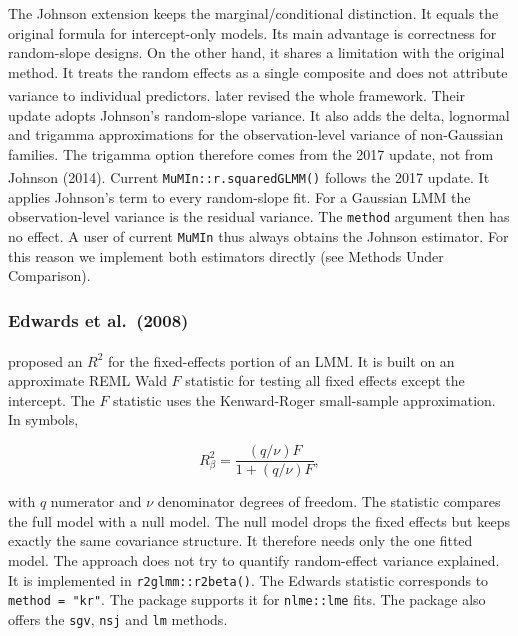 \documentclass[
  11pt,
]{article}
\begin{document}
The Johnson extension keeps the marginal/conditional distinction.
It equals the original formula for intercept-only models. Its main
advantage is correctness for random-slope designs. On the other
hand, it shares a limitation with the original method. It treats
the random effects as a single composite and does not attribute
variance to individual predictors.\textsuperscript{} later revised the whole
framework. Their update adopts Johnson's random-slope variance. It
also adds the delta, lognormal and trigamma approximations for the
observation-level variance of non-Gaussian families. The trigamma
option therefore comes from the 2017 update, not from Johnson
(2014). Current \texttt{MuMIn::r.squaredGLMM()}\textsuperscript{} follows
the 2017 update. It applies Johnson's term to every random-slope
fit. For a Gaussian LMM the observation-level variance is the
residual variance. The \texttt{method} argument then has no effect. A
user of current \texttt{MuMIn} thus always obtains the Johnson estimator.
For this reason we implement both estimators directly (see
Methods Under Comparison).

\subsubsection{Edwards et al.~(2008)}\label{edwards-et-al.-2008}

\textsuperscript{} proposed an \(R^2\) for the
fixed-effects portion of an LMM. It is built on an approximate
REML Wald \(F\) statistic for testing all fixed effects except the
intercept. The \(F\) statistic uses the Kenward-Roger small-sample
approximation. In symbols,

\begin{equation}
R^2_\beta = \frac{(q/\nu) F}{1 + (q/\nu) F},
\label{eq:edwards}
\end{equation}

with \(q\) numerator and \(\nu\) denominator degrees of freedom. The
statistic compares the full model with a null model. The null
model drops the fixed effects but keeps exactly the same
covariance structure. It therefore needs only the one fitted
model. The approach does not try to quantify random-effect
variance explained. It is implemented in \texttt{r2glmm::r2beta()}. The
Edwards statistic corresponds to \texttt{method\ =\ "kr"}. The package
supports it for \texttt{nlme::lme} fits. The package also offers the \texttt{sgv},
\texttt{nsj} and \texttt{lm} methods.
\end{document}
